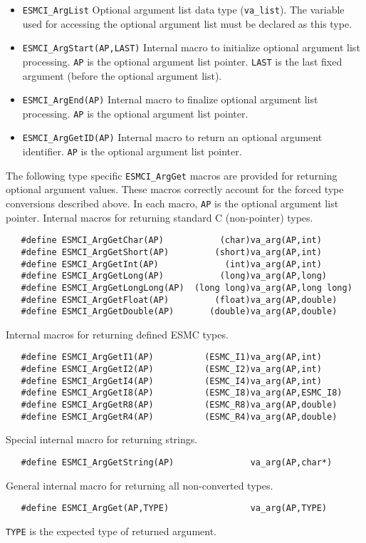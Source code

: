\begin{itemize}
\item \texttt{ESMCI\_ArgList}
\newline
Optional argument list data type (\texttt{va\_list}). The variable used for
accessing the optional argument list must be declared as this type.
\item \texttt{ESMCI\_ArgStart(AP,LAST)}
\newline
Internal macro to initialize optional argument list processing. \texttt{AP} is
the optional argument list pointer. \texttt{LAST} is the last fixed argument
(before the optional argument list).
\item \texttt{ESMCI\_ArgEnd(AP)}
\newline
Internal macro to finalize optional argument list processing. \texttt{AP} is
the optional argument list pointer.
\item \texttt{ESMCI\_ArgGetID(AP)}
\newline
Internal macro to return an optional argument identifier. \texttt{AP} is
the optional argument list pointer.
\end{itemize}

\noindent
The following type specific \texttt{ESMCI\_ArgGet} macros are provided for
returning optional argument values. These macros correctly account for the
forced type conversions described above. In each macro, \texttt{AP} is the
optional argument list pointer.
\newline\newline
\noindent
Internal macros for returning standard C (non-pointer) types.
\begin{verbatim}
   #define ESMCI_ArgGetChar(AP)           (char)va_arg(AP,int)
   #define ESMCI_ArgGetShort(AP)         (short)va_arg(AP,int)
   #define ESMCI_ArgGetInt(AP)             (int)va_arg(AP,int)
   #define ESMCI_ArgGetLong(AP)           (long)va_arg(AP,long)
   #define ESMCI_ArgGetLongLong(AP)  (long long)va_arg(AP,long long)
   #define ESMCI_ArgGetFloat(AP)         (float)va_arg(AP,double)
   #define ESMCI_ArgGetDouble(AP)       (double)va_arg(AP,double)
\end{verbatim}
\noindent
Internal macros for returning defined ESMC types.
\begin{verbatim}
   #define ESMCI_ArgGetI1(AP)          (ESMC_I1)va_arg(AP,int)
   #define ESMCI_ArgGetI2(AP)          (ESMC_I2)va_arg(AP,int)
   #define ESMCI_ArgGetI4(AP)          (ESMC_I4)va_arg(AP,int)
   #define ESMCI_ArgGetI8(AP)          (ESMC_I8)va_arg(AP,ESMC_I8)
   #define ESMCI_ArgGetR8(AP)          (ESMC_R8)va_arg(AP,double)
   #define ESMCI_ArgGetR4(AP)          (ESMC_R4)va_arg(AP,double)
\end{verbatim}
\noindent
Special internal macro for returning strings.
\begin{verbatim}
   #define ESMCI_ArgGetString(AP)               va_arg(AP,char*)
\end{verbatim}
\noindent
General internal macro for returning all non-converted types.
\begin{verbatim}
   #define ESMCI_ArgGet(AP,TYPE)                va_arg(AP,TYPE)
\end{verbatim}
\noindent
\texttt{TYPE} is the expected type of returned argument.


